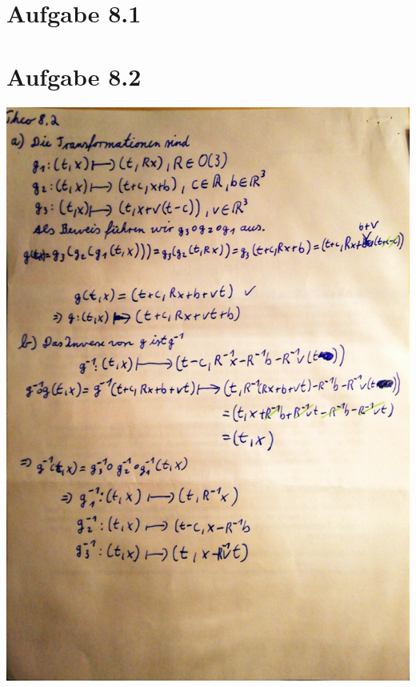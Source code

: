 \documentclass{theozettel}
\begin{document}

\section*{Aufgabe 8.1} 




\section*{Aufgabe 8.2}	
\begin{center}
\includegraphics[width=14cm]{PTP8-2)_1.pdf}

\end{center}
\end{document}

